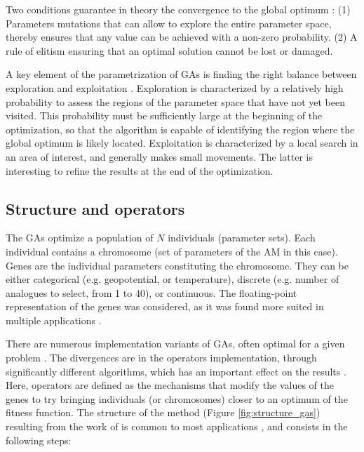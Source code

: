 \documentclass{ametsoc}
\begin{document}
Two conditions guarantee in theory the convergence to the global optimum \citep{Zitzler2004a}: (1) Parameters mutations that can allow to explore the entire parameter space, thereby ensures that any value can be achieved with a non-zero probability. (2) A rule of elitism ensuring that an optimal solution cannot be lost or damaged.

A key element of the parametrization of GAs is finding the right balance between exploration and exploitation \citep{Back1992a, Smith1997a}. Exploration is characterized by a relatively high probability to assess the regions of the parameter space that have not yet been visited. This probability must be sufficiently large at the beginning of the optimization, so that the algorithm is capable of identifying the region where the global optimum is likely located. Exploitation is characterized by a local search in an area of interest, and generally makes small movements. The latter is interesting to refine the results at the end of the optimization.


\subsection{Structure and operators}

The GAs optimize a population of $N$ individuals (parameter sets). Each individual contains a chromosome (set of parameters of the AM in this case). Genes are the individual parameters constituting the chromosome. They can be either categorical (e.g. geopotential, or temperature), discrete (e.g. number of analogues to select, from 1 to 40), or continuous. The floating-point representation \citep[instead of the canonical binary, see][]{Goldberg1989, Goldberg1990a, Holland1992b} of the genes was considered, as it was found more suited in multiple applications \citep{Michalewicz1996, Herrera1998a, Haupt2004, Back1996b, Gaffney2010a}. 

There are numerous implementation variants of GAs, often optimal for a given problem \citep{Hart1991a, Schraudolph1992a}. The divergences are in the operators implementation, through significantly different algorithms, which has an important effect on the results \citep{Gaffney2010a}. Here, operators are defined as the mechanisms that modify the values of the genes to try bringing individuals (or chromosomes) closer to an optimum of the fitness function. The structure of the method (Figure \ref{fig:structure_gas}) resulting from the work of \citet{Holland1992b} is common to most applications \citep{Back1993b}, and consists in the following steps:
\end{document}
